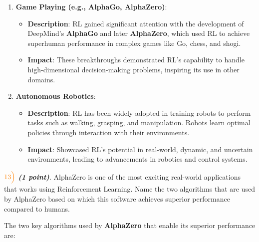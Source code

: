 \documentclass[11pt]{article}
\providecommand{\tightlist}{%
      \setlength{\itemsep}{0pt}\setlength{\parskip}{0pt}}
\begin{document}
\begin{enumerate}
\def\labelenumi{\arabic{enumi}.}
\tightlist
\item
  \textbf{Game Playing (e.g., AlphaGo, AlphaZero)}:

  \begin{itemize}
  \tightlist
  \item
    \textbf{Description}: RL gained significant attention with the
    development of DeepMind's \textbf{AlphaGo} and later
    \textbf{AlphaZero}, which used RL to achieve superhuman performance
    in complex games like Go, chess, and shogi.
  \item
    \textbf{Impact}: These breakthroughs demonstrated RL's capability to
    handle high-dimensional decision-making problems, inspiring its use
    in other domains.
  \end{itemize}
\item
  \textbf{Autonomous Robotics}:

  \begin{itemize}
  \tightlist
  \item
    \textbf{Description}: RL has been widely adopted in training robots
    to perform tasks such as walking, grasping, and manipulation. Robots
    learn optimal policies through interaction with their environments.
  \item
    \textbf{Impact}: Showcased RL's potential in real-world, dynamic,
    and uncertain environments, leading to advancements in robotics and
    control systems.
  \end{itemize}
\end{enumerate}

    \(\color{orange}13\Bigl)\) \textbf{\emph{(1 point)}}. AlphaZero is one
of the most exciting real-world applications that works using
Reinforcement Learning. Name the two algorithms that are used by
AlphaZero based on which this software achieves superior performance
compared to humans.

    The two key algorithms used by \textbf{AlphaZero} that enable its
superior performance are:
\end{document}
